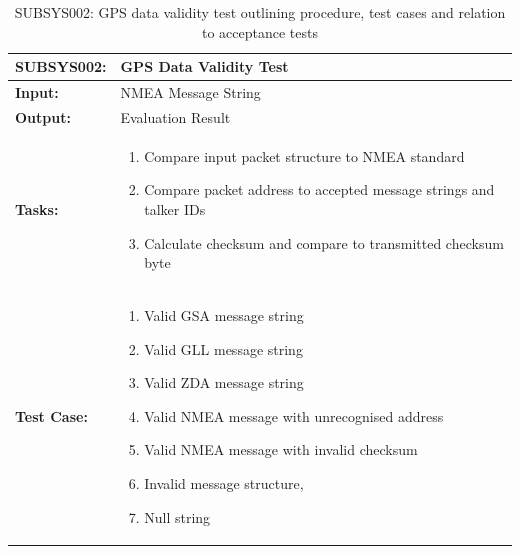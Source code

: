 \begin{table}[H]
    \centering
    \caption{SUBSYS002: GPS data validity test outlining procedure, test cases and relation to acceptance tests}
    \begin{tabular}{|m{}|m{}|}
    \hline
       \textbf{SUBSYS002: }  &  GPS Data Validity Test\\
       \hline
        \textbf{Input: } &  NMEA Message String\\
        \hline
        \textbf{Output: } & Evaluation Result\\
        \hline
        \textbf{Tasks: } & \begin{enumerate}
        \vspace{1mm}
            \item Compare input packet structure to NMEA standard
            \item Compare packet address to accepted message strings and talker IDs
            \item Calculate checksum and compare to transmitted checksum byte
        \end{enumerate}\\
        \hline
        \textbf{Test Case: } & \begin{enumerate}
            \vspace{1mm}
            \item Valid GSA message string
            \item Valid GLL message string
            \item Valid ZDA message string
            \item Valid NMEA message with unrecognised address
            \item Valid NMEA message with invalid checksum
            \item Invalid message structure,
            \item Null string
        \end{enumerate}\\
        \hline
    \end{tabular}

    \label{tab:SUBSYS002}
\end{table}

